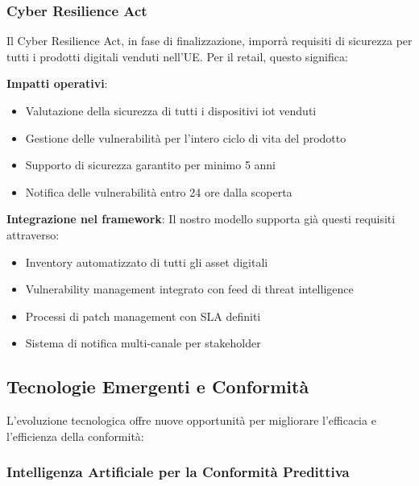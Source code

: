 \subsubsection{\texorpdfstring{Cyber Resilience Act}{4.9.1.2 - Cyber Resilience Act}}

Il Cyber Resilience Act, in fase di finalizzazione, imporrà requisiti di sicurezza per tutti i prodotti digitali venduti nell'UE. Per il retail, questo significa:

\textbf{Impatti operativi}:
\begin{itemize}
    \item Valutazione della sicurezza di tutti i dispositivi \gls{iot} venduti
    \item Gestione delle vulnerabilità per l'intero ciclo di vita del prodotto
    \item Supporto di sicurezza garantito per minimo 5 anni
    \item Notifica delle vulnerabilità entro 24 ore dalla scoperta
\end{itemize}

\textbf{Integrazione nel framework}:
Il nostro modello supporta già questi requisiti attraverso:
\begin{itemize}
    \item Inventory automatizzato di tutti gli asset digitali
    \item Vulnerability management integrato con feed di threat intelligence
    \item Processi di patch management con SLA definiti
    \item Sistema di notifica multi-canale per stakeholder
\end{itemize}

\subsection{\texorpdfstring{Tecnologie Emergenti e Conformità}{4.9.2 - Tecnologie Emergenti e Conformità}}
\label{subsec:4.9.2_tecnologie}

L'evoluzione tecnologica offre nuove opportunità per migliorare l'efficacia e l'efficienza della conformità:

\subsubsection{\texorpdfstring{Intelligenza Artificiale per la Conformità Predittiva}{4.9.2.1 - Intelligenza Artificiale per la Conformità Predittiva}}

